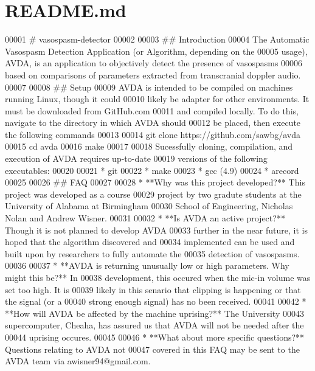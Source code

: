 \hypertarget{README_8md_source}{\section{R\+E\+A\+D\+M\+E.\+md}
}

\begin{DoxyCode}
00001 # vasospasm-detector
00002 
00003 ## Introduction
00004 The Automatic Vasospasm Detection Application (or Algorithm, depending on the
00005 usage), AVDA, is an application to objectively detect the presence of vasospasms
00006 based on comparisons of parameters extracted from transcranial doppler audio.
00007 
00008 ## Setup
00009 AVDA is intended to be compiled on machines running Linux, though it could
00010 likely be adapter for other environments. It must be downloaded from GitHub.com
00011 and compiled locally. To do this, navigate to the directory in which AVDA should
00012 be placed, then execute the following commands
00013 
00014    git clone https://github.com/sawbg/avda
00015    cd avda
00016    make
00017 
00018 Sucessfully cloning, compilation, and execution of AVDA requires up-to-date
00019 versions of the following executables:
00020 
00021 * git
00022 * make
00023 * gcc (4.9)
00024 * arecord
00025 
00026 ## FAQ
00027 
00028 * **Why was this project developed?** This project was developed as a course 
00029 project by two gradute students at the University of Alabama at Birmingham
00030 School of Engineering, Nicholas Nolan and Andrew Wisner.
00031 
00032 * **Is AVDA an active project?** Though it is not planned to develop AVDA
00033 further in the near future, it is hoped that the algorithm discovered and
00034 implemented can be used and built upon by researchers to fully automate the
00035 detection of vasospasms.
00036 
00037 * **AVDA is returning unusually low or high parameters. Why might this be?** In
00038   development, this occured when the mic-in volume was set too high. It is
00039 likely in this senario that clipping is happening or that the signal (or a
00040 strong enough signal) has no been received.
00041 
00042 * **How will AVDA be affected by the machine uprising?** The University
00043   supercomputer, Cheaha, has assured us that AVDA will not be needed after the
00044 uprising occures.
00045 
00046 * **What about more specific questions?** Questions relating to AVDA not
00047 covered in this FAQ may be sent to the AVDA team via awisner94@gmail.com.
\end{DoxyCode}
